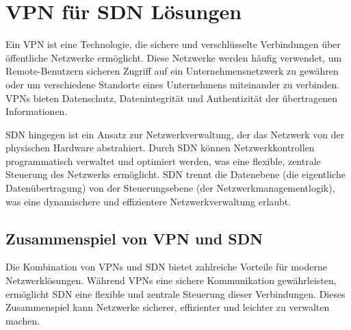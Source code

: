 \section{\gls{VPN} für \acrfull{SDN} Lösungen} \label{tailscale}

Ein \gls{VPN} ist eine Technologie, die sichere und verschlüsselte Verbindungen über öffentliche Netzwerke ermöglicht. Diese Netzwerke werden häufig verwendet, um Remote-Benutzern sicheren Zugriff auf ein Unternehmensnetzwerk zu gewähren oder um verschiedene Standorte eines Unternehmens miteinander zu verbinden. VPNs bieten Datenschutz, Datenintegrität und Authentizität der übertragenen Informationen.

\gls{SDN} hingegen ist ein Ansatz zur Netzwerkverwaltung, der das Netzwerk von der physischen Hardware abstrahiert. Durch \gls{SDN} können Netzwerkkontrollen programmatisch verwaltet und optimiert werden, was eine flexible, zentrale Steuerung des Netzwerks ermöglicht. \gls{SDN} trennt die Datenebene (die eigentliche Datenübertragung) von der Steuerungsebene (der Netzwerkmanagementlogik), was eine dynamischere und effizientere Netzwerkverwaltung erlaubt. \cite{SDN_Survey}

\subsection{Zusammenspiel von \gls{VPN} und \gls{SDN}}

Die Kombination von \gls{VPN}s und \gls{SDN} bietet zahlreiche Vorteile für moderne Netzwerklösungen. Während \gls{VPN}s eine sichere Kommunikation gewährleisten, ermöglicht \gls{SDN} eine flexible und zentrale Steuerung dieser Verbindungen. Dieses Zusammenspiel kann Netzwerke sicherer, effizienter und leichter zu verwalten machen. 

